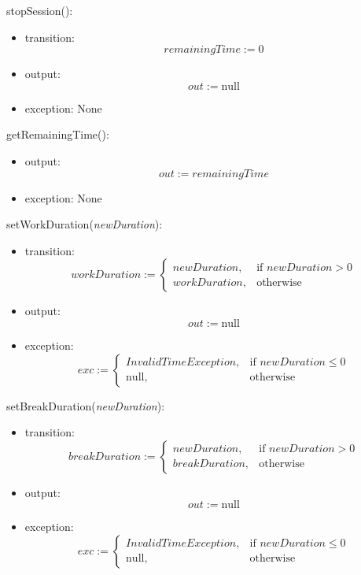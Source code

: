 \documentclass[12pt, titlepage]{article}
\begin{document}
\noindent stopSession():
\begin{itemize}
\item transition: 
    \[
    remainingTime := 0
    \]
\item output: 
    \[
    out := \text{null}
    \]
\item exception: None
\end{itemize}

\noindent getRemainingTime():
\begin{itemize}
\item output: 
    \[
    out := remainingTime
    \]
\item exception: None
\end{itemize}

\noindent setWorkDuration(\textit{newDuration}):
\begin{itemize}
\item transition: 
    \[
    workDuration := \begin{cases} 
    newDuration, & \text{if } newDuration > 0 \\
    workDuration, & \text{otherwise}
    \end{cases}
    \]
\item output: 
    \[
    out := \text{null}
    \]
\item exception: 
    \[
    exc := \begin{cases} 
    InvalidTimeException, & \text{if } newDuration \leq 0 \\
    \text{null}, & \text{otherwise} 
    \end{cases}
    \]
\end{itemize}

\noindent setBreakDuration(\textit{newDuration}):
\begin{itemize}
\item transition: 
    \[
    breakDuration := \begin{cases} 
    newDuration, & \text{if } newDuration > 0 \\
    breakDuration, & \text{otherwise}
    \end{cases}
    \]
\item output: 
    \[
    out := \text{null}
    \]
\item exception: 
    \[
    exc := \begin{cases} 
    InvalidTimeException, & \text{if } newDuration \leq 0 \\
    \text{null}, & \text{otherwise} 
    \end{cases}
    \]
\end{itemize}
\end{document}

